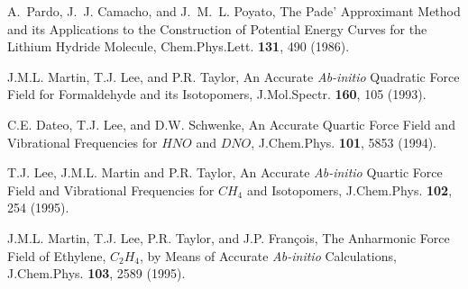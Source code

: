 \begin{thebibliography}{999}
A.~Pardo, J.~J. Camacho, and J.~M.~L. Poyato,
The Pade' Approximant Method and its Applications to the Construction of
Potential Energy Curves for the Lithium Hydride Molecule,
\newblock Chem.Phys.Lett. {\bf 131}, 490 (1986).


J.M.L. Martin, T.J. Lee, and P.R. Taylor,
An Accurate {\it Ab-initio} Quadratic Force Field for
Formaldehyde and its Isotopomers,
J.Mol.Spectr. {\bf 160}, 105 (1993).

%

C.E. Dateo, T.J. Lee, and D.W. Schwenke,
An Accurate Quartic Force Field and Vibrational Frequencies
for $HNO$ and $DNO$,
J.Chem.Phys. {\bf 101}, 5853 (1994).





T.J. Lee, J.M.L. Martin and P.R. Taylor,
An Accurate {\it Ab-initio} Quartic Force Field and Vibrational
Frequencies for $CH_4$ and Isotopomers,
J.Chem.Phys. {\bf 102}, 254 (1995).

J.M.L. Martin, T.J. Lee, P.R. Taylor,
and J.P. Fran\c{c}ois,
The Anharmonic Force Field of Ethylene, $C_2H_4$, by Means of
Accurate {\it Ab-initio} Calculations,
J.Chem.Phys. {\bf 103}, 2589 (1995).


\end{thebibliography}
